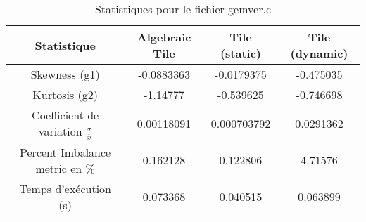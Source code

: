 \documentclass{article}
\begin{document}
\begin{table}[htbp]
  \centering
  \caption{Statistiques pour le fichier gemver.c}
  \begin{tabular}{|c|c|c|c|}
    \hline
    Statistique & Algebraic Tile & Tile (static) & Tile (dynamic) \\ 
    \hline
    Skewness (g1) & -0.0883363 & -0.0179375 & -0.475035 \\ 
    Kurtosis (g2) & -1.14777 & -0.539625 & -0.746698 \\ 
    Coefficient de variation $ \frac{\sigma}{\overline{x}} $ & 0.00118091 & 0.000703792 & 0.0291362\\ 
    Percent Imbalance metric en \% & 0.162128 & 0.122806 & 4.71576\\ 
    Temps d'exécution (s) &  0.073368    &  0.040515   &  0.063899   \\ 
    \hline
  \end{tabular}
\end{table}
\newpage
\end{document}
